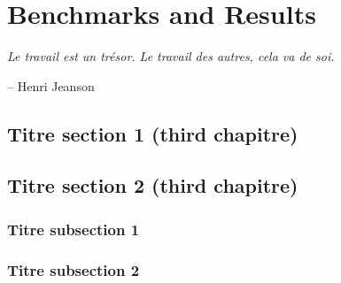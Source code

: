 \chapter{Benchmarks and Results}
\epigraph{\itshape Le travail est un trésor. Le travail des autres, cela va de soi.}{-- Henri Jeanson}

\stopcontents[chapters]
\startcontents[chapters]
\fancyhead[LE]{\textsc{\chaptername~\thechapter}}

\section{Titre section 1 (third chapitre)}

\lipsum[4] 

\lipsum[5] 

\section{Titre section 2 (third chapitre)}

\lipsum[6]

\subsection{Titre subsection 1}

\lipsum[7]

\lipsum[8]

\lipsum[13]

\subsection{Titre subsection 2}

\lipsum[9]

\lipsum[10]

\lipsum[12]
